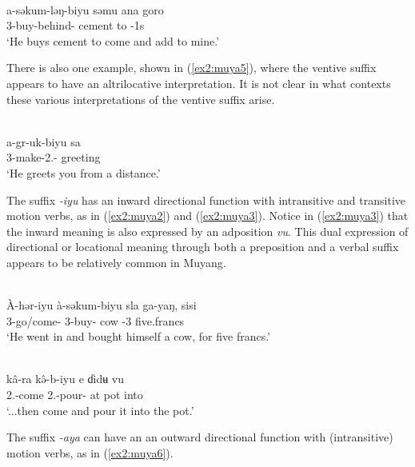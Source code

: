 \ea\label{ex2:muya4}
 \\
\gll a-səkum-ləŋ-biyu səmu ana goro \\
3-buy-behind- cement to -1s	\\
\glt `He buys cement to come and add to mine.'
\z 

There is also one example, shown in (\ref{ex2:muya5}), where the ventive suffix appears to have an altrilocative interpretation. It is not clear in what contexts these various interpretations of the ventive suffix arise. 

\ea\label{ex2:muya5}
 \\
\gll a-gr-uk-biyu sa \\
3-make-2.- greeting	\\
\glt `He greets you from a distance.'
\z 

The suffix \textit{-iyu} has an inward directional function with intransitive and transitive motion verbs, as in (\ref{ex2:muya2}) and (\ref{ex2:muya3}). Notice in (\ref{ex2:muya3}) that the inward meaning is also expressed by an adposition \textit{vu}. This dual expression of directional or locational meaning through both a preposition and a verbal suffix appears to be relatively common in Muyang. 

\ea\label{ex2:muya2}
 \\
\gll À-hər-iyu à-səkum-biyu sla ga-yaŋ, sisi \\
3-go/come- 3-buy- cow -3 five.francs	\\
\glt `He went in and bought himself a cow, for five francs.'

\ex\label{ex2:muya3}
 \\
\gll  kâ-ra kə̂-b-iyu e ɗidʉ vu \\
2.-come 2.-pour- at pot into	\\
\glt `...then come and pour it into the pot.'
\z 

The suffix \textit{-aya} can have an an outward directional function with (intransitive) motion verbs, as in (\ref{ex2:muya6}). 

